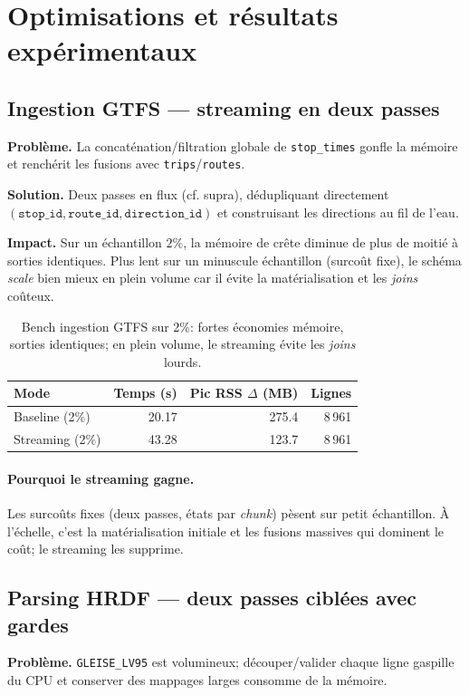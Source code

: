 \section{Optimisations et résultats expérimentaux}
\subsection{Ingestion GTFS — streaming en deux passes}
\textbf{Problème.} La concaténation/filtration globale de \texttt{stop\_times} gonfle la mémoire et renchérit les fusions avec \texttt{trips}/\texttt{routes}.

\textbf{Solution.} Deux passes en flux (cf. supra), dédupliquant directement \((\texttt{stop\_id},\texttt{route\_id},\texttt{direction\_id})\) et construisant les directions au fil de l’eau.

\textbf{Impact.} Sur un échantillon \(2\%\), la mémoire de crête diminue de plus de moitié à sorties identiques. Plus lent sur un minuscule échantillon (surcoût fixe), le schéma \emph{scale} bien mieux en plein volume car il évite la matérialisation et les \textit{joins} coûteux.

\begin{table}[h]
  \centering
  \begin{tabular}{lrrr}
    \toprule
    \textbf{Mode} & \textbf{Temps (s)} & \textbf{Pic RSS $\Delta$ (MB)} & \textbf{Lignes} \\
    \midrule
    Baseline (2\%) & 20.17 & 275.4 & 8\,961 \\
    Streaming (2\%) & 43.28 & 123.7 & 8\,961 \\
    \bottomrule
  \end{tabular}
  \caption[Bench GTFS (2\%)]{Bench ingestion GTFS sur 2\%: fortes économies mémoire, sorties identiques; en plein volume, le streaming évite les \textit{joins} lourds.}
  \label{tab:gtfs-bench-ch1}
\end{table}

\paragraph{Pourquoi le streaming gagne.} Les surcoûts fixes (deux passes, états par \textit{chunk}) pèsent sur petit échantillon. À l’échelle, c’est la matérialisation initiale et les fusions massives qui dominent le coût; le streaming les supprime.

\subsection{Parsing HRDF — deux passes ciblées avec gardes}
\textbf{Problème.} \texttt{GLEISE\_LV95} est volumineux; découper/valider chaque ligne gaspille du CPU et conserver des mappages larges consomme de la mémoire.


